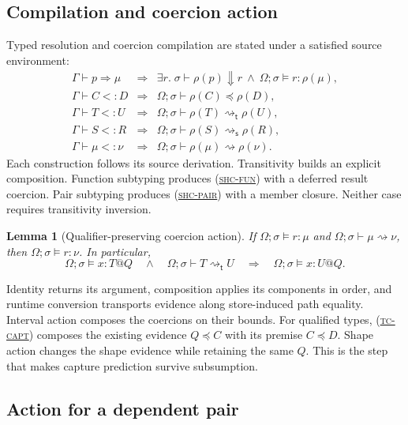 \documentclass[acmsmall,screen,nonacm]{acmart}
\newtheorem{lemma}[theorem]{Lemma}
\newcommand{\ruleref}[1]{%
  \textsc{(\hyperref[rule:#1]{#1})}}
\newcommand{\resolve}{\Downarrow}
\newcommand{\tcoerce}{\mathrel{\rightsquigarrow_{\mathsf t}}}
\newcommand{\scoerce}{\mathrel{\rightsquigarrow_{\mathsf s}}}
\newcommand{\coerce}{\mathrel{\rightsquigarrow}}
\newcommand{\semleq}{\mathrel{\preceq}}
\begin{document}
\subsection{Compilation and coercion action}

Typed resolution and coercion compilation are stated under a satisfied
source environment:
\[
\begin{array}{rcl}
\Gamma\vdash p\Rightarrow\mu
 &\Longrightarrow&
 \exists r.\;\sigma\vdash\rho(p)\resolve r
       \ \land\ \Omega;\sigma\models r:\rho(\mu),
\\[3pt]
\Gamma\vdash C<:D
 &\Longrightarrow&
 \Omega;\sigma\vdash\rho(C)\semleq\rho(D),
\\
\Gamma\vdash T<:U
 &\Longrightarrow&
 \Omega;\sigma\vdash\rho(T)\tcoerce\rho(U),
\\
\Gamma\vdash S<:R
 &\Longrightarrow&
 \Omega;\sigma\vdash\rho(S)\scoerce\rho(R),
\\
\Gamma\vdash\mu<:\nu
 &\Longrightarrow&
 \Omega;\sigma\vdash\rho(\mu)\coerce\rho(\nu).
\end{array}
\]
Each construction follows its source derivation.  Transitivity builds an
explicit composition.  Function subtyping produces \ruleref{shc-fun} with a
deferred result coercion.  Pair subtyping produces \ruleref{shc-pair} with a
member closure.  Neither case requires transitivity inversion.

\begin{lemma}[Qualifier-preserving coercion action]
\label{lem:coercion-action}
If \(\Omega;\sigma\models r:\mu\) and
\(\Omega;\sigma\vdash\mu\coerce\nu\), then
\(\Omega;\sigma\models r:\nu\).  In particular,
\[
 \Omega;\sigma\models x:T@Q
 \quad\land\quad
 \Omega;\sigma\vdash T\tcoerce U
 \quad\Longrightarrow\quad
 \Omega;\sigma\models x:U@Q.
\]
\end{lemma}

Identity returns its argument, composition applies its components in order,
and runtime conversion transports evidence along store-induced path
equality.  Interval action composes the coercions on their bounds.  For
qualified types, \ruleref{tc-capt} composes the existing evidence
\(Q\semleq C\) with its premise \(C\semleq D\).  Shape action changes the
shape evidence while retaining the same \(Q\).  This is the step that makes
capture prediction survive subsumption.

\subsection{Action for a dependent pair}
\label{sec:pair-action}
\end{document}
